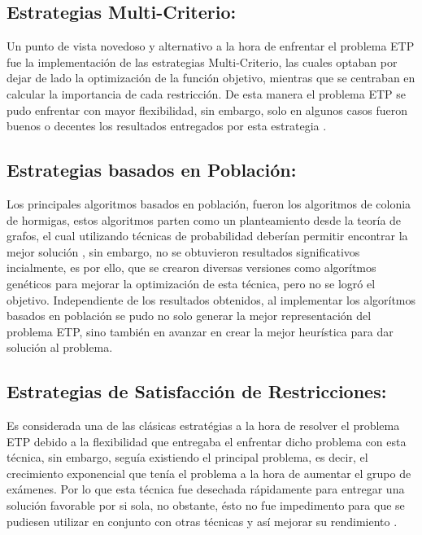 \subsection{Estrategias Multi-Criterio:}
Un punto de vista novedoso y alternativo a la hora de enfrentar el problema ETP fue la implementación de las estrategias Multi-Criterio, las cuales optaban por dejar de lado la optimización de la función objetivo, mientras que se centraban en calcular la importancia de cada restricción. De esta manera el problema ETP se pudo enfrentar con mayor flexibilidad, sin embargo, solo en algunos casos fueron buenos o decentes los resultados entregados por esta estrategia \cite{Cita17}. 

\subsection{Estrategias basados en Población:}
Los principales algoritmos basados en población, fueron los algoritmos de colonia de hormigas, estos algoritmos parten como un planteamiento desde la teoría de grafos, el cual utilizando técnicas de probabilidad deberían permitir encontrar la mejor solución \cite{Cita21}, sin embargo, no se obtuvieron resultados significativos incialmente, es por ello, que se crearon diversas versiones como algorítmos genéticos \cite{Cita22} para mejorar la optimización de esta técnica, pero no se logró el objetivo. Independiente de los resultados obtenidos, al implementar los algorítmos basados en población se pudo no solo generar la mejor representación del problema ETP, sino también en avanzar en crear la mejor heurística para dar solución al problema.

\subsection{Estrategias de Satisfacción de Restricciones:}
Es considerada una de las clásicas estratégias a la hora de resolver el problema ETP debido a la flexibilidad que entregaba el enfrentar dicho problema con esta técnica, sin embargo, seguía existiendo el principal problema, es decir, el crecimiento exponencial que tenía el problema a la hora de aumentar el grupo de exámenes. Por lo que esta técnica fue desechada rápidamente para entregar una solución favorable por si sola, no obstante, ésto no fue impedimento para que se pudiesen utilizar en conjunto con otras técnicas y así mejorar su rendimiento \cite{Cita20}.

